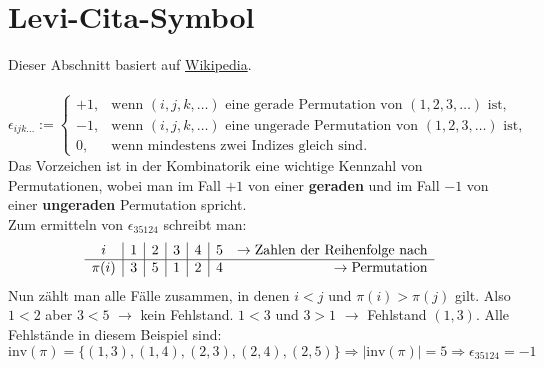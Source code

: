   \section{Levi-Cita-Symbol}\label{LeviCita}
  Dieser Abschnitt basiert auf \href{https://de.wikipedia.org/wiki/Levi-Civita-Symbol}{Wikipedia}.\\\\
  \begin{equation}
  	 \epsilon_{ijk\dots} :=
  	\begin{cases}
  		+1, & \text{wenn }(i,j,k,\dots) \text{ eine gerade Permutation von } (1,2,3,\dots) \text{ ist,} \\
  		-1, & \text{wenn }(i,j,k,\dots) \text{ eine ungerade Permutation von } (1,2,3,\dots) \text{ ist,} \\
  		0,  & \text{wenn mindestens zwei Indizes gleich sind.}
  	\end{cases}
  \end{equation}
  Das Vorzeichen ist in der Kombinatorik eine wichtige Kennzahl von Permutationen, wobei man im Fall $+1$ von einer \textbf{geraden} und im Fall $-1$ von einer \textbf{ungeraden} Permutation spricht.\\
  Zum ermitteln von $\epsilon_{35124}$ schreibt man:
  \begin{equation*}
  	\begin{array}{c|c|c|c|c|c r}
  		i&1&2&3&4&5&\rightarrow\text{Zahlen der Reihenfolge nach}\\\hline
  		\pi(i)&3&5&1&2&4&\rightarrow\text{Permutation}
  	\end{array}
  \end{equation*}
  Nun zählt man alle Fälle zusammen, in denen $i<j$ und $\pi(i)>\pi(j)$ gilt. Also $1<2$ aber $3<5$ $\rightarrow$ kein Fehlstand. $1<3$ und $3>1$ $\rightarrow$ Fehlstand $(1,3)$. Alle Fehlstände in diesem Beispiel sind:
  \begin{equation*}
  	\text{inv} (\pi)=\{(1,3),(1,4),(2,3),(2,4),(2,5)\} \Rightarrow |\text{inv} (\pi)|=5 \Rightarrow \epsilon_{35124}=-1
  \end{equation*}
